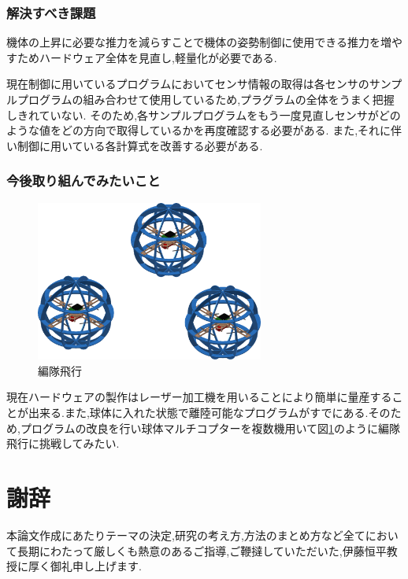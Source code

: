 \documentclass[12pt,oneside]{sotsuken_paper}
\begin{document}
\subsection{解決すべき課題}
機体の上昇に必要な推力を減らすことで機体の姿勢制御に使用できる推力を増やすためハードウェア全体を見直し,軽量化が必要である.


現在制御に用いているプログラムにおいてセンサ情報の取得は各センサのサンプルプログラムの組み合わせて使用しているため,プラグラムの全体をうまく把握しきれていない.
そのため,各サンプルプログラムをもう一度見直しセンサがどのような値をどの方向で取得しているかを再度確認する必要がある.
また,それに伴い制御に用いている各計算式を改善する必要がある.


\subsection{今後取り組んでみたいこと}

\begin{figure}[htbp]
	\begin{center}
		\includegraphics[width=75mm]{image/hen.png}
		\caption{編隊飛行}
		\label{fig:hen}
	\end{center}
\end{figure}

現在ハードウェアの製作はレーザー加工機を用いることにより簡単に量産することが出来る.また,球体に入れた状態で離陸可能なプログラムがすでにある.そのため,プログラムの改良を行い球体マルチコプターを複数機用いて図\ref{fig:hen}のように編隊飛行に挑戦してみたい.





\chapter*{謝辞}
本論文作成にあたりテーマの決定,研究の考え方,方法のまとめ方など全てにおいて長期にわたって厳しくも熱意のあるご指導,ご鞭撻していただいた,伊藤恒平教授に厚く御礼申し上げます.
\end{document}
